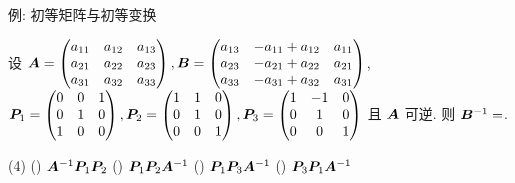 \begin{frame}{例: 初等矩阵与初等变换}
	\onslide<+->
	\begin{exercise}
		设 ${\boldsymbol{A}}=\begin{pmatrix}
			a_{11}&a_{12}&a_{13}\\
			a_{21}&a_{22}&a_{23}\\
			a_{31}&a_{32}&a_{33}
		\end{pmatrix},{\boldsymbol{B}}=\begin{pmatrix}
			a_{13}&-a_{11}+a_{12}&a_{11}\\
			a_{23}&-a_{21}+a_{22}&a_{21}\\
			a_{33}&-a_{31}+a_{32}&a_{31}
		\end{pmatrix}$,\\
		${\boldsymbol{P}}_1=\begin{pmatrix}
			0&0&1\\0&1&0\\1&0&0
		\end{pmatrix},{\boldsymbol{P}}_2=\begin{pmatrix}
			1&1&0\\0&1&0\\0&0&1
		\end{pmatrix},{\boldsymbol{P}}_3=\begin{pmatrix}
			1&-1&0\\0&1&0\\0&0&1
		\end{pmatrix}$ 且 ${\boldsymbol{A}}$ 可逆.
		则 ${\boldsymbol{B}}^{-1}=$.
		\begin{taskschoice}(4)
			() ${\boldsymbol{A}}^{-1}{\boldsymbol{P}}_1{\boldsymbol{P}}_2$
			() ${\boldsymbol{P}}_1{\boldsymbol{P}}_2{\boldsymbol{A}}^{-1}$
			() ${\boldsymbol{P}}_1{\boldsymbol{P}}_3{\boldsymbol{A}}^{-1}$
			() ${\boldsymbol{P}}_3{\boldsymbol{P}}_1{\boldsymbol{A}}^{-1}$
		\end{taskschoice}
	\end{exercise}
\end{frame}


